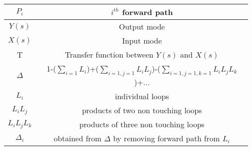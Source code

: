 \begin{tabular}{|c|c|}
  \hline
  $P_i$ & $i^{th}$ forward path \\
  \hline
  $Y(s)$ & Output mode  \\
  \hline
  $X(s)$ & Input mode \\
  \hline
  T & Transfer function between $Y(s)$ and $X(s)$ \\
  \hline
  $\Delta$ & 1-($\sum_{i=1} L_i$)+($\sum_{i=1,j=1} L_iL_j$)-($\sum_{i=1,j=1,k=1} L_iL_jL_k$)+... \\
  \hline
  $L_i$ & individual loops \\
  \hline
  $L_iL_j$ & products of two non touching loops \\
  \hline 
  $L_iL_jL_k$ & products of three non touching loops \\
  \hline
  $\Delta_i$ & obtained from $\Delta$ by removing forward path from $L_i$ \\
  \hline
  \end{tabular}
